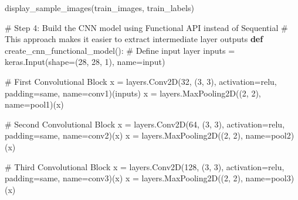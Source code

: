 \documentclass[
  letterpaper,
  DIV=11,
  numbers=noendperiod]{scrreprt}
\newenvironment{Shaded}{\begin{snugshade}}{\end{snugshade}}
\newcommand{\CommentTok}[1]{\textcolor[rgb]{0.37,0.37,0.37}{#1}}
\newcommand{\DecValTok}[1]{\textcolor[rgb]{0.68,0.00,0.00}{#1}}
\newcommand{\KeywordTok}[1]{\textcolor[rgb]{0.00,0.23,0.31}{\textbf{#1}}}
\newcommand{\NormalTok}[1]{\textcolor[rgb]{0.00,0.23,0.31}{#1}}
\newcommand{\OperatorTok}[1]{\textcolor[rgb]{0.37,0.37,0.37}{#1}}
\newcommand{\StringTok}[1]{\textcolor[rgb]{0.13,0.47,0.30}{#1}}
\begin{document}
\begin{Shaded}
\begin{Highlighting}[]
\NormalTok{display\_sample\_images(train\_images, train\_labels)}

\CommentTok{\# Step 4: Build the CNN model using Functional API instead of Sequential}
\CommentTok{\# This approach makes it easier to extract intermediate layer outputs}
\KeywordTok{def}\NormalTok{ create\_cnn\_functional\_model():}
    \CommentTok{\# Define input layer}
\NormalTok{    inputs }\OperatorTok{=}\NormalTok{ keras.Input(shape}\OperatorTok{=}\NormalTok{(}\DecValTok{28}\NormalTok{, }\DecValTok{28}\NormalTok{, }\DecValTok{1}\NormalTok{), name}\OperatorTok{=}\StringTok{\textquotesingle{}input\textquotesingle{}}\NormalTok{)}
    
    \CommentTok{\# First Convolutional Block}
\NormalTok{    x }\OperatorTok{=}\NormalTok{ layers.Conv2D(}\DecValTok{32}\NormalTok{, (}\DecValTok{3}\NormalTok{, }\DecValTok{3}\NormalTok{), activation}\OperatorTok{=}\StringTok{\textquotesingle{}relu\textquotesingle{}}\NormalTok{, padding}\OperatorTok{=}\StringTok{\textquotesingle{}same\textquotesingle{}}\NormalTok{, name}\OperatorTok{=}\StringTok{\textquotesingle{}conv1\textquotesingle{}}\NormalTok{)(inputs)}
\NormalTok{    x }\OperatorTok{=}\NormalTok{ layers.MaxPooling2D((}\DecValTok{2}\NormalTok{, }\DecValTok{2}\NormalTok{), name}\OperatorTok{=}\StringTok{\textquotesingle{}pool1\textquotesingle{}}\NormalTok{)(x)}
    
    \CommentTok{\# Second Convolutional Block}
\NormalTok{    x }\OperatorTok{=}\NormalTok{ layers.Conv2D(}\DecValTok{64}\NormalTok{, (}\DecValTok{3}\NormalTok{, }\DecValTok{3}\NormalTok{), activation}\OperatorTok{=}\StringTok{\textquotesingle{}relu\textquotesingle{}}\NormalTok{, padding}\OperatorTok{=}\StringTok{\textquotesingle{}same\textquotesingle{}}\NormalTok{, name}\OperatorTok{=}\StringTok{\textquotesingle{}conv2\textquotesingle{}}\NormalTok{)(x)}
\NormalTok{    x }\OperatorTok{=}\NormalTok{ layers.MaxPooling2D((}\DecValTok{2}\NormalTok{, }\DecValTok{2}\NormalTok{), name}\OperatorTok{=}\StringTok{\textquotesingle{}pool2\textquotesingle{}}\NormalTok{)(x)}
    
    \CommentTok{\# Third Convolutional Block}
\NormalTok{    x }\OperatorTok{=}\NormalTok{ layers.Conv2D(}\DecValTok{128}\NormalTok{, (}\DecValTok{3}\NormalTok{, }\DecValTok{3}\NormalTok{), activation}\OperatorTok{=}\StringTok{\textquotesingle{}relu\textquotesingle{}}\NormalTok{, padding}\OperatorTok{=}\StringTok{\textquotesingle{}same\textquotesingle{}}\NormalTok{, name}\OperatorTok{=}\StringTok{\textquotesingle{}conv3\textquotesingle{}}\NormalTok{)(x)}
\NormalTok{    x }\OperatorTok{=}\NormalTok{ layers.MaxPooling2D((}\DecValTok{2}\NormalTok{, }\DecValTok{2}\NormalTok{), name}\OperatorTok{=}\StringTok{\textquotesingle{}pool3\textquotesingle{}}\NormalTok{)(x)}
    

\end{Highlighting}
\end{Shaded}
\end{document}
